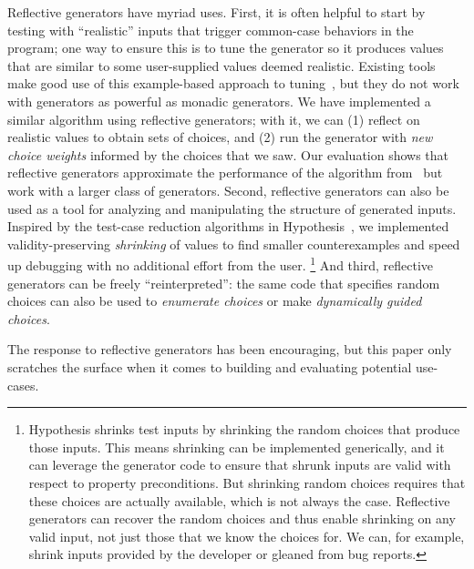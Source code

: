 Reflective generators have myriad uses. First,
%
it is often helpful to start by testing with
``realistic'' inputs that trigger common-case behaviors in the program;
one way to ensure this is to tune the generator so
it produces values that are similar to some user-supplied values deemed
realistic. Existing tools make good use of this example-based approach to
tuning~\cite{soremekun2020inputs}, but they do not work with generators as
powerful as monadic generators. We have implemented a
similar algorithm using
reflective generators; with it, we can (1) reflect on realistic values to
obtain sets of choices, and (2) run the generator with {\em new choice weights}
informed by the choices that we saw. Our evaluation shows that reflective
generators approximate the performance of the algorithm
from~\cite{soremekun2020inputs} but work with a larger class of generators.
%
Second,
reflective generators can also be used as a tool for analyzing and
manipulating the structure of generated inputs. Inspired by the test-case
reduction algorithms in Hypothesis~\cite{maciver_test-case_2020}, we implemented
validity-preserving {\em shrinking} of values to find smaller counterexamples
and speed up debugging with no additional effort from the user.%
%
\footnote{%
\normalsize
Hypothesis shrinks test inputs by shrinking the random choices
that produce those
inputs. This means shrinking can be implemented
generically, and it can leverage the generator code to ensure that shrunk
inputs are valid with respect to property preconditions.  But shrinking
random choices requires that these choices are actually available, which
is not always the case. Reflective generators
can
recover the random choices and thus enable shrinking
on any
valid input, not just those that we know the choices for.  We can, for
example, shrink inputs provided by the developer or
gleaned from bug reports.
}
%
And third, reflective generators can be freely
``reinterpreted'': the same code that specifies random choices can
also be used to {\em enumerate choices} or make {\em dynamically guided choices}.

%
The response to reflective generators has been encouraging, but
this paper only scratches the surface when it comes to building and
evaluating potential use-cases.


